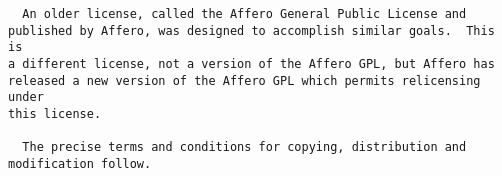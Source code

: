 \begin{lstlisting}
  An older license, called the Affero General Public License and
published by Affero, was designed to accomplish similar goals.  This is
a different license, not a version of the Affero GPL, but Affero has
released a new version of the Affero GPL which permits relicensing under
this license.

  The precise terms and conditions for copying, distribution and
modification follow.
\end{lstlisting}


\newpage